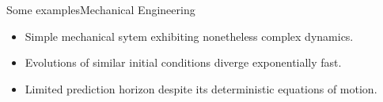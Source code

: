 \documentclass[usenames,dvipsnames,svgnames,10pt,aspectratio=169]{beamer}
\begin{document}
\begin{frame}[t, c]{Some examples}{Mechanical Engineering}
	\begin{minipage}{.48\textwidth}
		\begin{itemize}
			\item Simple mechanical sytem exhibiting nonetheless complex dynamics.

			\bigskip

			\item Evolutions of similar initial conditions diverge exponentially fast.

			\bigskip

			\item Limited prediction horizon despite its deterministic equations of motion.
		\end{itemize}
	\end{minipage}%
	\hfill
	\begin{minipage}{.48\textwidth}
		\vspace{-1cm}
		\begin{center}
		\end{center}
	\end{minipage}

	\vspace{1cm}
\end{frame}
\end{document}
